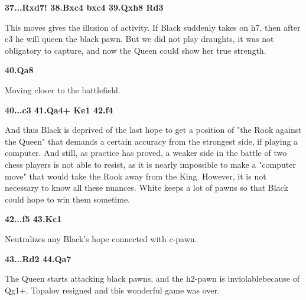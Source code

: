 \documentclass[
	11pt,twocolumn]{article}
\renewcommand{\bf}{\bfseries}
\newcommand{\nf}{\normalfont}
\begin{document}
{\bf 37...Rxd7! 38.Bxc4 bxc4 39.Qxh8 Rd3 }

This moves gives the illusion of activity. If Black suddenly takes on h7, then after c3 he will queen the black pawn. But we did not play draughts, it was not obligatory to capture, and now the Queen could show her true strength.

{\bf 40.Qa8 }

Moving closer to the battlefield.

{\bf 40...c3 41.Qa4+ Ke1 42.f4 }

And thus Black is deprived of the last hope to get a position of "the Rook against the Queen" that demands a certain accuracy from the strongest side, if playing a computer. And still, as practice has proved, a weaker side in the battle of two chess players is not able to resist, as it is nearly impossible to make a "computer move" that would take the Rook away from the King. However, it is not necessary to know all these nuances. White keeps a lot of pawns so that Black could hope to win them sometime.

{\bf 42...f5 43.Kc1 }

Neutralizes any Black's hope connected with c-pawn.

{\bf 43...Rd2 44.Qa7}

The Queen starts attacking black pawns, and the h2-pawn is inviolablebecause of Qg1+. Topalov resigned and this wonderful game was over.






\onecolumn
\nf



\end{document}
